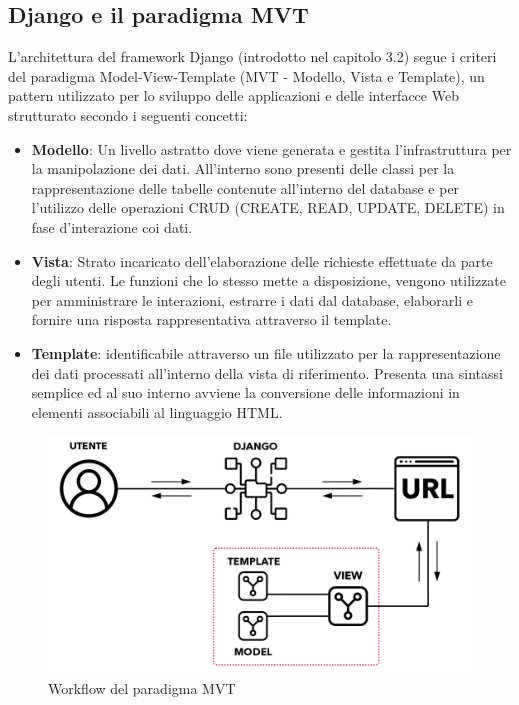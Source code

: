 \subsection{Django e il paradigma MVT}
L'architettura del framework Django (introdotto nel capitolo 3.2) segue i criteri del paradigma Model-View-Template (MVT - Modello, Vista e Template), un pattern utilizzato per lo sviluppo delle applicazioni e delle interfacce Web strutturato secondo i seguenti concetti:
\begin{itemize}
    \item \textbf{Modello}: Un livello astratto dove viene generata e gestita l'infrastruttura per la manipolazione dei dati. All'interno sono presenti delle classi per la rappresentazione delle tabelle contenute all'interno del database e per l'utilizzo delle operazioni CRUD (CREATE, READ, UPDATE, DELETE) in fase d'interazione coi dati.
    \item \textbf{Vista}: Strato incaricato dell'elaborazione delle richieste effettuate da parte degli utenti. Le funzioni che lo stesso mette a disposizione, vengono utilizzate per amministrare le interazioni, estrarre i dati dal database, elaborarli e fornire una risposta rappresentativa attraverso il template.
    \item \textbf{Template}: identificabile attraverso un file utilizzato per la rappresentazione dei dati processati all'interno della vista di riferimento. Presenta una sintassi semplice ed al suo interno avviene la conversione delle informazioni in elementi associabili al linguaggio HTML.
\end{itemize}

\clearpage
\begin{figure}[ht!]
    \centering
    \includegraphics[width=120mm]{images/Paradigma MVT.png}
    \caption{Workflow del paradigma MVT \label{overflow}}
\end{figure}

